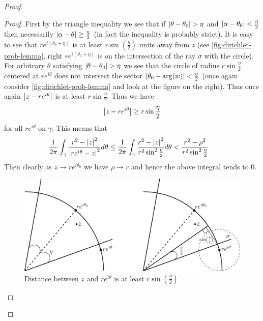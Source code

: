 \begin{proof}
\begin{proof}
    First by the triangle inequality we see that if $\left|\theta - \theta_0\right| > \eta$ and $\left|\alpha - \theta_0\right| < \frac{\eta}{2}$ then necessarily $\left|\alpha - \theta\right| \geq \frac{\eta}{2}$ (in fact the inequality is probably strict). It is easy to see that $re^{i(\theta_0 + \eta)}$ is at least $r \sin \left( \frac{\eta}{2} \right)$ units away from $z$ (see \autoref{fig:dirichlet-prob-lemma}, right $re^{i (\theta_0 + \eta)}$ is on the intersection of the ray $\sigma$ with the circle). For arbitrary $\theta$ satisfying $\left|\theta - \theta_0\right| > \eta$ we see that the circle of radius $r \sin\frac{\eta}{2}$ centered at $re^{i \theta}$ does not intersect the sector $\left|\theta_0 - \arg(w)\right| < \frac{\eta}{2}$ (once again consider \autoref{fig:dirichlet-prob-lemma} and look at the figure on the right). Thus once again $\left|z - re^{i \theta}\right|$ is at least $r \sin \frac{\eta}{2}$. Thus we have
    $$\left|z - re^{i \theta}\right| \geq r \sin \frac{\eta}{2}$$
    for all $re^{i \theta}$ on $\gamma$. This means that 
    \begin{align*}
        \frac{1}{2\pi} \int_{\gamma} \frac{r^2 - \left|z\right|^2}{\left|re^{i\theta} - z\right|^2} d\theta &\leq \frac{1}{2\pi} \int_\gamma \frac{r^2 - \left|z\right|^2}{r^2 \sin^2 \frac{\eta}{2}} d\theta < \frac{r^2 - \rho^2}{r^2 \sin^2 \frac{\eta}{2}}
    \end{align*}
    Then clearly as $z \to re^{i\theta_0}$ we have $\rho \to r$ and hence the above integral tends to 0.

    \begin{figure}[ht]
        \centering
        \includegraphics[scale=0.8]{Images/dirichlet_prob_lemma.png}
        \caption{Distance between $z$ and $re^{i\theta}$ is at least $r \sin\left(\frac{\eta}{2}\right)$}
        \label{fig:dirichlet-prob-lemma}
    \end{figure}
\end{proof}


\end{proof}
